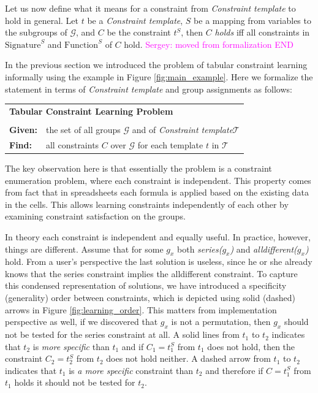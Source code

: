 \documentclass{ecai}
\newcommand{\sergey}[1]{\textcolor{magenta}{{\sc Sergey:} #1}\xspace}
\newcommand{\constraints}{\ensuremath{\mathcal{T}}\xspace}
\newcommand{\format}[1]{\textit{#1}\xspace}
\newcommand{\template}{\format{Constraint template}}
\newcommand{\CSignature}{Signature\xspace}
\newcommand{\CFunction}{Function\xspace}
\newcommand{\groups}{\ensuremath{\mathcal{G}}\xspace}
\begin{document}
Let us now define what it means for a constraint from \template to hold in general. Let $t$ be a \template, $S$ be a mapping from variables to the subgroups of \groups, and $C$ be the constraint $t^S$, then $C$ \textit{holds} iff all constraints in $\text{\CSignature}^S$ and $\text{\CFunction}^S$ of $C$ hold.
\sergey{moved from formalization END}

In the previous section we introduced the problem of tabular constraint learning informally using the example in Figure \ref{fig:main_example}. Here we formalize the statement in terms of \template and group assignments as follows: 

\begin{minipage}[c]{14em}
  \vspace{5pt}
  \begin{tabular}{ll}
    \multicolumn{2}{l}{{\textbf{Tabular Constraint Learning Problem}}}\\
    \vspace{-4pt}
    &\\
    \textbf{Given:}& the set of all groups $\groups$ and of \template $\constraints$\\
    \textbf{Find:}&  all constraints $C$ over \groups for each template $t$ in \constraints \\
  \end{tabular}
  \vspace{6pt}
\end{minipage}

  The key observation here is that essentially the problem is a constraint enumeration problem, where each constraint is independent. This property comes from fact that in spreadsheets each formula is applied based on the existing data in the cells. This allows learning constraints independently of each other by examining constraint satisfaction on the groups.


  In theory each constraint is independent and equally useful. In practice, however, things are different. Assume that for some $g_x$ both \textit{series($g_x$)} and \textit{alldifferent($g_x$)} hold. From a user's perspective the last solution is useless, since he or she already knows that the series constraint implies the alldifferent constraint. To capture this condensed representation \cite{condensed} of solutions, we have introduced a specificity (generality) order between constraints, which is depicted using solid (dashed) arrows in Figure \ref{fig:learning_order}. This matters from implementation perspective as well, if we discovered that $g_x$ is not a permutation, then $g_x$ should not be tested for the series constraint at all. A solid lines from $t_1$ to $t_2$ indicates that $t_2$ is \textit{more specific} than $t_1$ and if $C_1=t_1^S$ from $t_1$ does not hold, then the constraint $C_2=t_2^S$ from $t_2$ does not hold neither. A dashed arrow from $t_1$ to $t_2$ indicates that $t_1$ is \textit{a more specific} constraint than $t_2$ and therefore if $C=t_1^S$ from $t_1$ holds it should not be tested for $t_2$.
\end{document}
